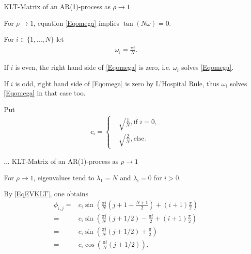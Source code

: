 \begin{frame}{KLT-Matrix of an AR(1)-process as $\rho\to 1$}

\bit
\item For $\rho\to 1$, equation \eqref{Eqomega} implies $\tan(N\omega)=0$.
\item For $i\in\{1,\dots,N\}$ let 
\begin{align*}
\omega_i = \frac{\pi i}{N}.
\end{align*}
\item If $i$ is even, the right hand side of \eqref{Eqomega} is zero, i.e. $\omega_i$ solves \eqref{Eqomega}. 
\item If $i$ is odd, right hand side of \eqref{Eqomega} is zero by L'Hospital Rule, thus $\omega_i$ solves \eqref{Eqomega} in that case too. 

\item Put 
\begin{align*}
c_i=\begin{cases} &\sqrt{\frac{1}{N}}, \text{if $i=0$, } \\ &\sqrt{\frac{2}{N}}, \text{else.} \end{cases}
\end{align*}
\eit
\end{frame}

\begin{frame}{... KLT-Matrix of an AR(1)-process as $\rho\to 1$}
\bit
\item For $\rho\to 1$, eigenvalues tend to $\lambda_1=N$ and $\lambda_i=0$ for $i>0$. 
\item
By \eqref{EqEVKLT}, one obtains
\begin{align*}
\phi_{i,j}=&c_i\sin\left( \frac{\pi i}{N}\left(j+1-\frac{N+1}{2}\right)+(i+1)\frac{\pi}{2}\right)\\
=&c_i\sin\left(\frac{\pi i}{N}(j+1/2)-\frac{\pi i}{2}+(i+1)\frac{\pi}{2}\right)\\
=&c_i\sin\left(\frac{\pi i}{N}(j+1/2)+\frac{\pi}{2}\right)\\
=&c_i\cos\left(\frac{\pi i}{N}(j+1/2)\right).
\end{align*}
\item[\iarrow]  
\eit
\end{frame}



%
%
%
%






